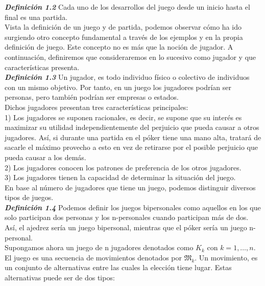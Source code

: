 \documentclass[10pt,a4paper]{book}
\begin{document}
\textit{\textbf{Definición 1.2}} Cada uno de los desarrollos del juego desde un inicio hasta el final es una partida.\\


Vista la definición de un juego y de partida, podemos observar cómo ha ido surgiendo otro concepto fundamental a través de los ejemplos y en la propia definición de juego. Este concepto no es más que la noción de jugador. A continuación, definiremos que consideraremos en lo sucesivo como jugador y que características presenta.\\


\textit{\textbf{Definición 1.3}} Un jugador, es todo individuo físico o colectivo de individuos con un mismo objetivo. Por tanto, en un juego los jugadores podrían ser personas, pero también podrían ser empresas o estados.\\

Dichos jugadores presentan tres características principales:\\
1)	Los jugadores se suponen racionales, es decir, se supone que su interés es maximizar su utilidad independientemente del perjuicio que pueda causar a otros jugadores. Así, si durante una partida en el póker tiene una mano alta, tratará de sacarle el máximo provecho a esto en vez de retirarse por el posible perjuicio que pueda causar a los demás.\\

2)	Los jugadores conocen los patrones de preferencia de los otros jugadores.\\

3)	Los jugadores tienen la capacidad de determinar la situación del juego.\\

En base al número de jugadores que tiene un juego, podemos distinguir diversos tipos de juegos.\\


\textit{\textbf{Definición 1.4}} Podemos definir los juegos bipersonales como aquellos en los que solo participan dos personas y los n-personales cuando participan más de dos. Así, el ajedrez sería un juego bipersonal, mientras que el póker sería un juego n-personal.\\


Supongamos ahora un juego de n jugadores denotados como $K_k$ con $k=1, \ldots, n$. El juego es una secuencia de movimientos denotados por $\mathfrak{M}_k$. Un movimiento, es un conjunto de alternativas entre las cuales la elección tiene lugar. Estas alternativas puede ser de dos tipos: \\
\end{document}
